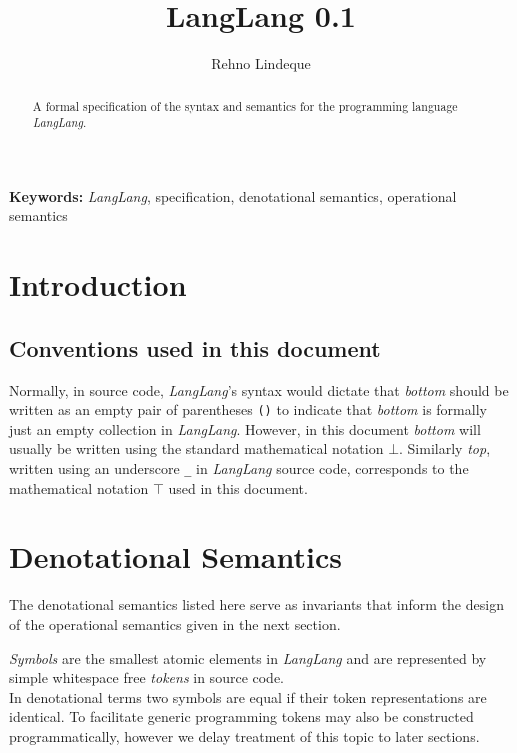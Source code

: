 \documentclass[a4paper,11pt]{article}
\begin{document}
\title{LangLang 0.1}
\author{Rehno Lindeque}

\maketitle

\begin{abstract}
A formal specification of the syntax and semantics for the programming language \textsl{LangLang}.
\end{abstract}
\textbf{Keywords:} \textsl{LangLang}, specification, denotational semantics, operational semantics

\section{Introduction}

\subsection{Conventions used in this document}
\label{sec:conventions}

Normally, in source code, \textsl{LangLang}'s syntax would dictate that \emph{bottom} should be written as an empty pair of parentheses \texttt{()} to indicate that \emph{bottom} is formally just an empty collection in \textsl{LangLang}.
However, in this document \emph{bottom} will usually be written using the standard mathematical notation $\bot$.
Similarly \emph{top}, written using an underscore \texttt{\_} in \textsl{LangLang} source code, corresponds to the mathematical notation $\top$ used in this document.\\

\section{Denotational Semantics}

The denotational semantics listed here serve as invariants that inform the design of the operational semantics given in the next section.

\emph{Symbols} are the smallest atomic elements in \textsl{LangLang} and are represented by simple whitespace free \emph{tokens} in source code.\\
In denotational terms two symbols are equal if their token representations are identical.
To facilitate generic programming tokens may also be constructed programmatically, however we delay treatment of this topic to later sections.\\
\end{document}
